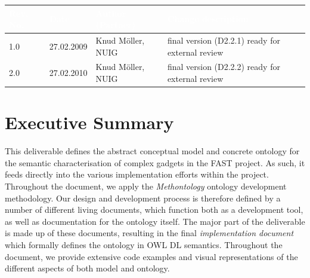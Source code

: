 \documentclass[twoside]{fast_latex}
\newcommand\authorOne{Knud Möller, NUIG}
\begin{document}
\begin{small}
\begin{tabular}{|l|l|l|p{7.5cm}|}
\hline
\rowcolor{fast@lightgrey}\textcolor{white}{\textbf{Rev. No.}} &
                            \textcolor{white}{\textbf{Date}} &
                            \textcolor{white}{\textbf{Author (Partner)}} &
							\textcolor{white}{\textbf{Change description}}\\ \hline
1.0 & 27.02.2009 & \authorOne & final version (D2.2.1) ready for external review \\ \hline
2.0 & 27.02.2010 & \authorOne & final version (D2.2.2) ready for external review \\ \hline
\end{tabular}
\end{small}

\color{black}

\vfill

\newpage


\clearpage

\section*{Executive Summary}
\doublespacing

This deliverable defines the abstract conceptual model and concrete ontology for the semantic characterisation of complex gadgets in the FAST project. As such, it feeds directly into the various implementation efforts within the project. 
Throughout the document, we apply the \emph{Methontology} ontology development methodology. Our design and development process is therefore defined by a number of different living documents, which function both as a development tool, as well as documentation for the ontology itself. The major part of the deliverable is made up of these documents, resulting in the final \emph{implementation document} which formally defines the ontology in OWL DL semantics. Throughout the document, we provide extensive code examples and visual representations of the different aspects of both model and ontology.
\end{document}
